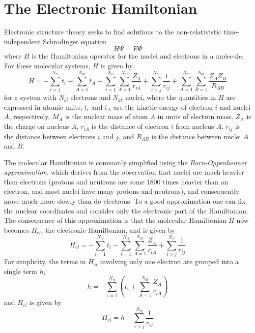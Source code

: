 \section{The Electronic Hamiltonian}
\label{sec:eham}
Electronic structure theory seeks to find solutions to the
non-relativistic time-independent Schrodinger equation 
\begin{equation} 
	H\Psi = E\Psi	
\end{equation}
where $H$ is the Hamiltonian operator for the nuclei and
electrons in a molecule. For these molecular systems, $H$ is given by 
\begin{equation}
  H = -\sum_{i=1}^{N_{el}}t_i
	- \sum_{A=1}^{N_{at}}t_A
	- \sum_{i=1}^{N_{el}}\sum_{A=1}^{N_{at}}\frac{Z_A}{r_{iA}} 
	+ \sum_{i>j}^{N_{el}}\frac{1}{r_{ij}}
	+ \sum_{A=1}^{N_{at}}\sum_{B=1}^{N_{at}}\frac{Z_AZ_B}{R_{AB}}
\end{equation}
for a system with $N_{el}$ electrons and $N_{at}$ nuclei,
where the quantities in $H$ are expressed in atomic units, $t_i$ and
$t_A$ are the kinetic energy of electron $i$ and nuclei $A$,
respectively, $M_A$ is the nuclear mass of atom $A$ in units of
electron mass, $Z_A$ is the charge on nucleus $A$, $r_{iA}$ is the
distance of electron $i$ from nucleus $A$, $r_{ij}$ is the distance
between electrons $i$ and $j$, and $R_{AB}$ is the distance between
nuclei $A$ and $B$.

The molecular Hamiltonian is commonly simplified using the
\emph{Born-Oppenheimer approximation}, which derives from the observation
that nuclei are much heavier than electrons (protons and neutrons are
some 1800 times heavier than an electron, and most nuclei have many
protons and neutrons), and consequently move much more slowly than do
electrons.  To a good approximation one can fix the nuclear
coordinates and consider only the electronic part of the
Hamiltonian. The consequence of this approximation is that the
molecular Hamiltonian $H$ now becomes $H_{el}$, the electronic
Hamiltonian, and is given by 
\begin{equation} 
  H_{el} = -\sum_{i=1}^{N_{el}}t_i
	- \sum_{i=1}^{N_{el}}\sum_{A=1}^{N_{at}}\frac{Z_A}{r_{iA}} 
	+ \sum_{i>j}^{N_{el}}\frac{1}{r_{ij}}
\label{eq:hel}
\end{equation}
For simplicity, the terms in $H_{el}$ involving only one
electron are grouped into a single term $h$,
\begin{equation}
  h = -\sum_{i=1}^{N_{el}} \left(t_i
	+\sum_{A=1}^{N_{at}}\frac{Z_A}{r_{iA}}
	\right)
\end{equation}
and $H_{el}$ is given by
\begin{equation}
  H_{el} = h + \sum_{i>j}^{N_{el}} \frac{1}{r_{ij}}
\end{equation}

